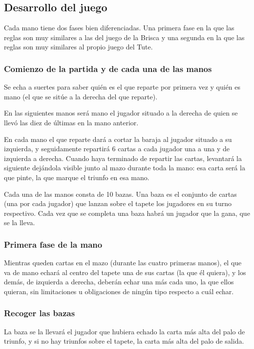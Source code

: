 \documentclass{article}
\begin{document}
\subsection*{Desarrollo del juego}
Cada mano tiene dos fases bien diferenciadas. Una primera fase en la que las reglas son muy similares a las del juego de la Brisca y una segunda en la que las reglas son muy similares al propio juego del Tute.
\subsubsection*{Comienzo de la partida y de cada una de las manos}
Se echa a suertes para saber quién es el que reparte por primera vez y quién es mano (el que se sitúe a la derecha del que reparte).

En las siguientes manos será mano el jugador situado a la derecha de quien se llevó las diez de últimas en la mano anterior.

En cada mano el que reparte dará a cortar la baraja al jugador situado a su izquierda, y seguidamente repartirá 6 cartas a cada jugador una a una y de izquierda a derecha. Cuando haya terminado de repartir las cartas, levantará la siguiente dejándola visible junto al mazo durante toda la mano: esa carta será la que pinte, la que marque el triunfo en esa mano.

Cada una de las manos consta de 10 bazas. Una baza es el conjunto de cartas (una por cada jugador) que lanzan sobre el tapete los jugadores en su turno respectivo. Cada vez que se completa una baza habrá un jugador que la gana, que se la lleva.
\subsubsection*{Primera fase de la mano}
Mientras queden cartas en el mazo (durante las cuatro primeras manos), el que va de mano echará al centro del tapete una de sus cartas (la que él quiera), y los demás, de izquierda a derecha, deberán echar una más cada uno, la que ellos quieran, sin limitaciones u obligaciones de ningún tipo respecto a cuál echar.

\subsubsection*{Recoger las bazas}

La baza se la llevará el jugador que hubiera echado la carta más alta del palo de triunfo, y si no hay triunfos sobre el tapete, la carta más alta del palo de salida.
\end{document}

